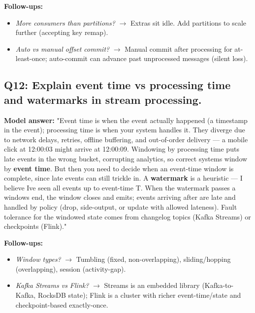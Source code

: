 \documentclass[11pt]{article}
\providecommand{\tightlist}{\setlength{\itemsep}{1pt}\setlength{\parskip}{0pt}}
\begin{document}
\textbf{Follow-ups:}

\begin{itemize}
\tightlist
\item
  \emph{More consumers than partitions?} \(\rightarrow\) Extras sit idle. Add partitions to scale further (accepting key remap).
\item
  \emph{Auto vs manual offset commit?} \(\rightarrow\) Manual commit after processing for at-least-once; auto-commit can advance past unprocessed messages (silent loss).
\end{itemize}

\subsection{Q12: Explain event time vs processing time and watermarks in stream processing.}\label{q12-explain-event-time-vs-processing-time-and-watermarks-in-stream-processing}

\textbf{Model answer:} "Event time is when the event actually happened (a timestamp in the event); processing time is when your system handles it. They diverge due to network delays, retries, offline buffering, and out-of-order delivery --- a mobile click at 12:00:03 might arrive at 12:00:09. Windowing by processing time puts late events in the wrong bucket, corrupting analytics, so correct systems window by \textbf{event time}. But then you need to decide when an event-time window is \textquotesingle complete,\textquotesingle{} since late events can still trickle in. A \textbf{watermark} is a heuristic --- \textquotesingle I believe I\textquotesingle ve seen all events up to event-time T.\textquotesingle{} When the watermark passes a window\textquotesingle s end, the window closes and emits; events arriving after are \textquotesingle late\textquotesingle{} and handled by policy (drop, side-output, or update with allowed lateness). Fault tolerance for the windowed state comes from changelog topics (Kafka Streams) or checkpoints (Flink)."

\textbf{Follow-ups:}

\begin{itemize}
\tightlist
\item
  \emph{Window types?} \(\rightarrow\) Tumbling (fixed, non-overlapping), sliding/hopping (overlapping), session (activity-gap).
\item
  \emph{Kafka Streams vs Flink?} \(\rightarrow\) Streams is an embedded library (Kafka-to-Kafka, RocksDB state); Flink is a cluster with richer event-time/state and checkpoint-based exactly-once.
\end{itemize}
\end{document}

